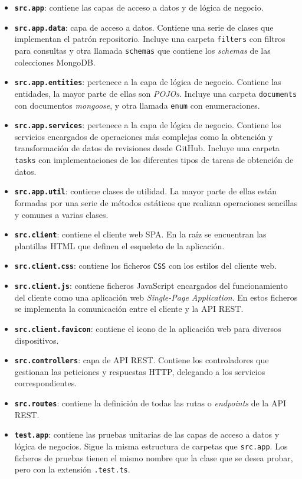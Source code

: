 \begin{itemize}
	\item \textbf{\texttt{src.app}}: contiene las capas de acceso a datos y de lógica de negocio.
	\item \textbf{\texttt{src.app.data}}: capa de acceso a datos. Contiene una serie de clases que implementan el patrón repositorio. Incluye una carpeta \texttt{filters} con filtros para consultas y otra llamada \texttt{schemas} que contiene los \textit{schemas} de las colecciones MongoDB.
	\item \textbf{\texttt{src.app.entities}}: pertenece a la capa de lógica de negocio. Contiene las entidades, la mayor parte de ellas son \textit{POJOs}. Incluye una carpeta \texttt{documents} con documentos \textit{mongoose}, y otra llamada \texttt{enum} con enumeraciones.
	\item \textbf{\texttt{src.app.services}}: pertenece a la capa de lógica de negocio. Contiene los servicios encargados de operaciones más complejas como la obtención y transformación de datos de revisiones desde GitHub. Incluye una carpeta \texttt{tasks} con implementaciones de los diferentes tipos de tareas de obtención de datos.
	\item \textbf{\texttt{src.app.util}}: contiene clases de utilidad. La mayor parte de ellas están formadas por una serie de métodos estáticos que realizan operaciones sencillas y comunes a varias clases.
	\item \textbf{\texttt{src.client}}: contiene el cliente web SPA. En la raíz se encuentran las plantillas HTML que definen el esqueleto de la aplicación.
	\item \textbf{\texttt{src.client.css}}: contiene los ficheros \texttt{CSS} con los estilos del cliente web.
	\item \textbf{\texttt{src.client.js}}: contiene ficheros JavaScript encargados del funcionamiento del cliente como una aplicación web \textit{Single-Page Application}. En estos ficheros se implementa la comunicación entre el cliente y la API REST.
	\item \textbf{\texttt{src.client.favicon}}: contiene el icono de la aplicación web para diversos dispositivos.
	\item \textbf{\texttt{src.controllers}}: capa de API REST. Contiene los controladores que gestionan las peticiones y respuestas HTTP, delegando a los servicios correspondientes.
	\item \textbf{\texttt{src.routes}}: contiene la definición de todas las rutas o \textit{endpoints} de la API REST.
	\item \textbf{\texttt{test.app}}: contiene las pruebas unitarias de las capas de acceso a datos y lógica de negocios. Sigue la misma estructura de carpetas que \texttt{src.app}. Los ficheros de pruebas tienen el mismo nombre que la clase que se desea probar, pero con la extensión \texttt{.test.ts}.
\end{itemize}

